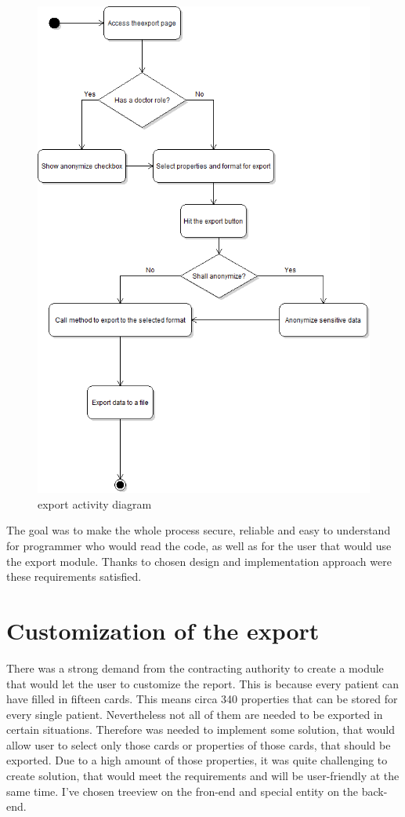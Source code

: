 \documentclass[thesis=B,english]{FITthesis}[2012/10/20]
\begin{document}
\begin{figure}\centering
\includegraphics[width=0.5\paperwidth]{exportDiagram}
		\caption{export activity diagram}\label{fig:logo}
\end{figure}

The goal was to make the whole process secure, reliable and easy to understand for programmer who would read the code, as well as for the user that would use the export module. Thanks to chosen design and implementation approach were these requirements satisfied.
\section{Customization of the export}
There was a strong demand from the contracting authority to create a module that would let the user to customize the report. This is because every patient can have filled in fifteen cards. This means circa 340 properties that can be stored for every single patient. Nevertheless not all of them are needed to be exported in certain situations. Therefore was needed to implement some solution, that would allow user to select only those cards or properties of those cards, that should be exported.
Due to a high amount of those properties, it was quite challenging to create solution, that would meet the requirements and will be user-friendly at the same time. I've chosen treeview on the fron-end and special entity on the back-end.
\end{document}
